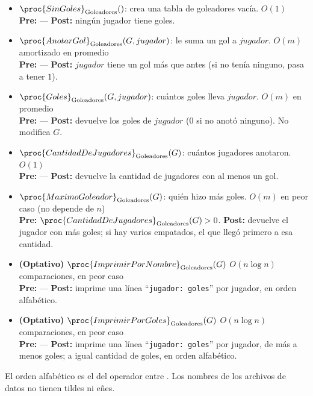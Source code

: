 \documentclass{article}
\newcommand{\OP}[2]{\proc{#1}_{\text{#2}}}
\begin{document}
\begin{itemize}
\item $\OP{SinGoles}{Goleadores}()$: crea una tabla de goleadores vacía. \hfill $O(1)$ \\
  {\footnotesize \textbf{Pre:} --- \quad \textbf{Post:} ningún jugador tiene goles.}
\item $\OP{AnotarGol}{Goleadores}(G, jugador)$: le suma un gol a $jugador$. \hfill $O(m)$ amortizado en promedio \\
  {\footnotesize \textbf{Pre:} --- \quad \textbf{Post:} $jugador$ tiene un gol más que antes (si no tenía ninguno, pasa a tener $1$).}
\item $\OP{Goles}{Goleadores}(G, jugador)$: cuántos goles lleva $jugador$. \hfill $O(m)$ en promedio \\
  {\footnotesize \textbf{Pre:} --- \quad \textbf{Post:} devuelve los goles de $jugador$ ($0$ si no anotó ninguno). No modifica $G$.}
\item $\OP{CantidadDeJugadores}{Goleadores}(G)$: cuántos jugadores anotaron. \hfill $O(1)$ \\
  {\footnotesize \textbf{Pre:} --- \quad \textbf{Post:} devuelve la cantidad de jugadores con al menos un gol.}
\item $\OP{MaximoGoleador}{Goleadores}(G)$: quién hizo más goles. \hfill $O(m)$ en peor caso (no depende de $n$) \\
  {\footnotesize \textbf{Pre:} $\OP{CantidadDeJugadores}{Goleadores}(G) > 0$. \quad \textbf{Post:} devuelve el jugador con más goles; si hay varios empatados, el que llegó primero a esa cantidad.}
\item \textbf{(Optativo)} $\OP{ImprimirPorNombre}{Goleadores}(G)$ \hfill $O(n \log n)$ comparaciones, en peor caso \\
  {\footnotesize \textbf{Pre:} --- \quad \textbf{Post:} imprime una línea ``\texttt{jugador: goles}'' por jugador, en orden alfabético.}
\item \textbf{(Optativo)} $\OP{ImprimirPorGoles}{Goleadores}(G)$ \hfill $O(n \log n)$ comparaciones, en peor caso \\
  {\footnotesize \textbf{Pre:} --- \quad \textbf{Post:} imprime una línea ``\texttt{jugador: goles}'' por jugador, de más a menos goles; a igual cantidad de goles, en orden alfabético.}
\end{itemize}

El orden alfabético es el del operador \cppinline{<} entre
. Los nombres de los archivos de datos no
tienen tildes ni eñes.
\end{document}
